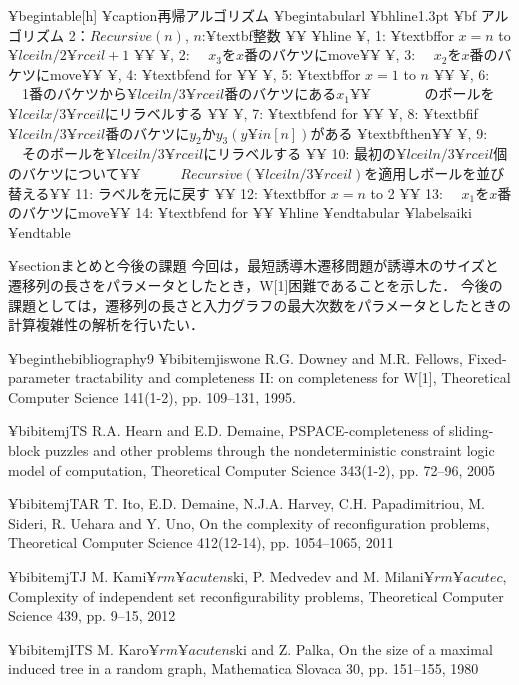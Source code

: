 ¥begin{table}[h]
	¥caption{再帰アルゴリズム}
	¥begin{tabular}{l}
		¥bhline{1.3pt}
		{¥bf アルゴリズム 2}：$Recursive(n)$, $n$:¥textbf{整数}  ¥¥ ¥hline
		¥, 1: ¥textbf{for} $x=n$ to $¥lceil n/2 ¥rceil+1$ ¥¥
		¥, 2: ~~$x_3$を$x$番のバケツにmove¥¥
		¥, 3: ~~$x_2$を$x$番のバケツにmove¥¥
		¥, 4: ¥textbf{end for} ¥¥
		¥, 5: ¥textbf{for} $x=1$ to $n$ ¥¥
		¥, 6: ~~1番のバケツから$¥lceil n/3 ¥rceil$番のバケツにある$x_1$¥¥
		~~~~~~~のボールを$¥lceil x/3 ¥rceil$にリラベルする ¥¥
		¥, 7: ¥textbf{end for} ¥¥
		¥, 8: ¥textbf{if} $¥lceil n/3 ¥rceil$番のバケツに$y_2かy_3(y¥in[n])$がある ¥textbf{then}¥¥
		¥, 9: ~~そのボールを$¥lceil n/3 ¥rceil$にリラベルする ¥¥
		10:  最初の$¥lceil n/3 ¥rceil$個のバケツについて¥¥
		~~~~~$Recursive(¥lceil n/3 ¥rceil)$を適用しボールを並び替える¥¥
		11: ラベルを元に戻す ¥¥
		12: ¥textbf{for} $x=n$ to 2 ¥¥
		13: ~~$x_1$を$x$番のバケツにmove¥¥
		14: ¥textbf{end for} ¥¥ ¥hline 
	¥end{tabular} 
	¥label{saiki}
¥end{table}



¥section{まとめと今後の課題}
今回は，最短誘導木遷移問題が誘導木のサイズと遷移列の長さをパラメータとしたとき，W[1]困難であることを示した．
今後の課題としては，遷移列の長さと入力グラフの最大次数をパラメータとしたときの計算複雑性の解析を行いたい．

¥begin{thebibliography}{9}
¥bibitem{jiswone}
R.G. Downey and M.R. Fellows, 
Fixed-parameter tractability and completeness II: on completeness for W[1], 
Theoretical Computer Science 141(1-2), pp. 109--131, 1995.

¥bibitem{jTS}
R.A. Hearn and E.D. Demaine, 
PSPACE-completeness of sliding-block puzzles and other problems through the nondeterministic constraint logic model of computation,  Theoretical Computer Science 343(1-2), pp. 72--96, 2005

¥bibitem{jTAR}
T. Ito, E.D. Demaine, N.J.A. Harvey, C.H. Papadimitriou, M. Sideri, R. Uehara and Y. Uno, 
On the complexity of reconfiguration problems, 
Theoretical Computer Science 412(12-14), pp. 1054--1065, 2011

¥bibitem{jTJ}
M. Kami${¥rm ¥acute{n}}$ski, P. Medvedev and M. Milani${¥rm ¥acute{c}}$, 
Complexity of independent set reconfigurability problems, 
Theoretical Computer Science 439, pp. 9--15, 2012

¥bibitem{jITS}
M. Karo${¥rm ¥acute{n}}$ski and Z. Palka,  
On the size of a maximal induced tree in a random graph, 
Mathematica Slovaca 30, pp. 151--155, 1980 

